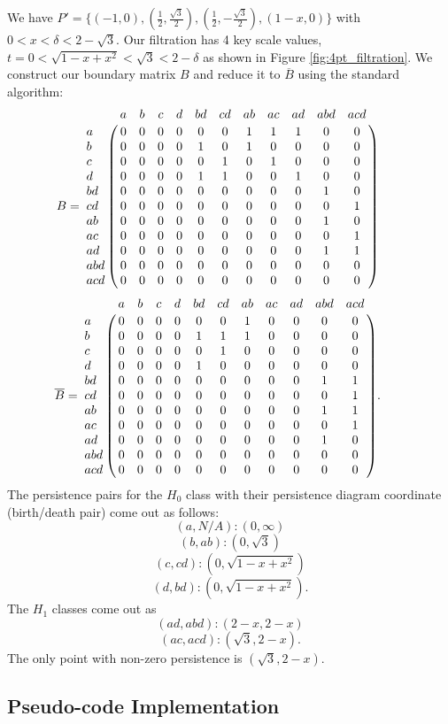 \documentclass[letterpaper,titlepage]{article}
\begin{document}
We have $P' = \{(-1,0),(\frac{1}{2},\frac{\sqrt{3}}{2}),(\frac{1}{2},-\frac{\sqrt{3}}{2}),(1-x,0)\}$ with $0< x < \delta < 2-\sqrt{3}$.
Our filtration has 4 key scale values, $t = 0<\sqrt{1-x+x^2}< \sqrt{3}< 2-\delta$ as shown in Figure \ref{fig:4pt_filtration}. We construct our boundary matrix $B$ and reduce it to $\overline{B}$ using the standard algorithm:
$$B=\bordermatrix{ 
    &   a & b & c & d & bd & cd & ab & ac & ad & abd & acd\cr
    a & 0 & 0 & 0 & 0 &  0 &  0 &  1 &  1 &  1 &   0 &   0 \cr
    b & 0 & 0 & 0 & 0 &  1 &  0 &  1 &  0 &  0 &   0 &   0\cr
    c & 0 & 0 & 0 & 0 &  0 &  1 &  0 &  1 &  0 &   0 &   0\cr
    d & 0 & 0 & 0 & 0 &  1 &  1 &  0 &  0 &  1 &   0 &   0\cr
   bd & 0 & 0 & 0 & 0 &  0 &  0 &  0 &  0 &  0 &   1 &   0\cr
   cd & 0 & 0 & 0 & 0 &  0 &  0 &  0 &  0 &  0 &   0 &   1\cr
   ab & 0 & 0 & 0 & 0 &  0 &  0 &  0 &  0 &  0 &   1 &   0\cr
   ac & 0 & 0 & 0 & 0 &  0 &  0 &  0 &  0 &  0 &   0 &   1\cr
   ad & 0 & 0 & 0 & 0 &  0 &  0 &  0 &  0 &  0 &   1 &   1\cr
  abd & 0 & 0 & 0 & 0 &  0 &  0 &  0 &  0 &  0 &   0 &   0\cr
  acd & 0 & 0 & 0 & 0 &  0 &  0 &  0 &  0 &  0 &   0 &   0\cr
    } \qquad$$
$$\overline{B}=\bordermatrix{ 
    &   a & b & c & d & bd & cd & ab & ac & ad & abd & acd\cr
    a & 0 & 0 & 0 & 0 &  0 &  0 &  1 &  0 &  0 &   0 &   0 \cr
    b & 0 & 0 & 0 & 0 &  1 &  1 &  1 &  0 &  0 &   0 &   0\cr
    c & 0 & 0 & 0 & 0 &  0 &  1 &  0 &  0 &  0 &   0 &   0\cr
    d & 0 & 0 & 0 & 0 &  1 &  0 &  0 &  0 &  0 &   0 &   0\cr
   bd & 0 & 0 & 0 & 0 &  0 &  0 &  0 &  0 &  0 &   1 &   1\cr
   cd & 0 & 0 & 0 & 0 &  0 &  0 &  0 &  0 &  0 &   0 &   1\cr
   ab & 0 & 0 & 0 & 0 &  0 &  0 &  0 &  0 &  0 &   1 &   1\cr
   ac & 0 & 0 & 0 & 0 &  0 &  0 &  0 &  0 &  0 &   0 &   1\cr
   ad & 0 & 0 & 0 & 0 &  0 &  0 &  0 &  0 &  0 &   1 &   0\cr
  abd & 0 & 0 & 0 & 0 &  0 &  0 &  0 &  0 &  0 &   0 &   0\cr
  acd & 0 & 0 & 0 & 0 &  0 &  0 &  0 &  0 &  0 &   0 &   0\cr
    }. \qquad$$
The persistence pairs for the $H_0$ class with their persistence diagram coordinate (birth/death pair) come out as follows:
$$(a,N/A): (0,\infty)$$
$$(b,ab): (0,\sqrt{3})$$
$$(c, cd): (0,\sqrt{1-x+x^2})$$
$$(d, bd): (0,\sqrt{1-x+x^2}).$$
The $H_1$ classes come out as
$$(ad, abd): (2-x, 2-x)$$
$$(ac, acd): (\sqrt{3}, 2-x).$$
The only point with non-zero persistence is $(\sqrt{3}, 2-x).$


\subsection{Pseudo-code Implementation}
\end{document}
